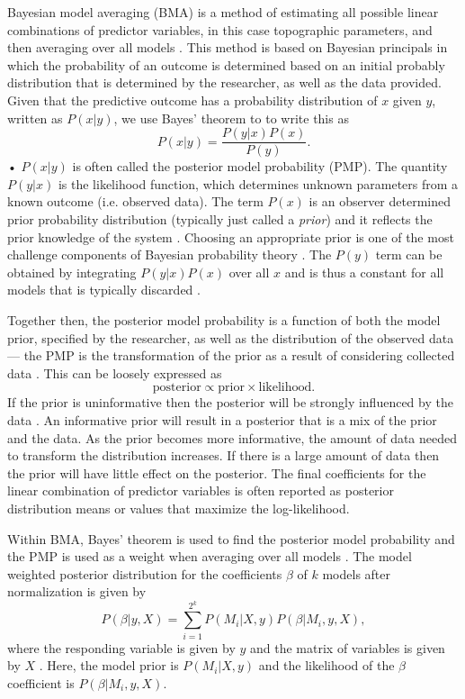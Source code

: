 \documentclass[12pt]{article}
\begin{document}
Bayesian model averaging (BMA) is a method of estimating all possible linear combinations of predictor variables, in this case topographic parameters, and then averaging over all models \citep{Raftery1997, Wasserman2000, Raftery2005}.  This method is based on Bayesian principals in which the probability of an outcome is determined based on an initial probably distribution that is determined by the researcher, as well as the data provided. Given that the predictive outcome has a probability distribution of $x$ given $y$, written as $P(x|y)$, we use Bayes' theorem to to write this as
\begin{equation}
P(x|y) = \frac{P(y|x)P(x)}{P(y)}.
\end{equation}•
$P(x|y)$ is often called the posterior model probability (PMP). The quantity $P(y|x)$ is the likelihood function, which determines unknown parameters from a known outcome (i.e. observed data). The term $P(x)$ is an observer determined prior probability distribution (typically just called a \textit{prior}) and it reflects the prior knowledge of the system \citep{Raftery1997}. Choosing an appropriate prior is one of the most challenge components of Bayesian probability theory \citep{Wasserman2000}. The $P(y)$ term can be obtained by integrating $P(y|x)P(x)$ over all $x$ and is thus a constant for all models that is typically discarded \citep{Wasserman2000}. 

Together then, the posterior model probability is a function of both the model prior, specified by the researcher, as well as the distribution of the observed data --- the PMP is the transformation of the prior as a result of considering collected data \citep{Wasserman2000}. This can be loosely expressed as
\begin{equation}
\textrm{posterior} \propto \textrm{prior} \times \textrm{likelihood}.
\end{equation}
If the prior is uninformative then the posterior will be strongly influenced by the data \citep{Wasserman2000}. An informative prior will result in a posterior that is a mix of the prior and the data. As the prior becomes more informative, the amount of data needed to transform the distribution increases. If there is a large amount of data then the prior will have little effect on the posterior. The final coefficients for the linear combination of predictor variables is often reported as posterior distribution means or values that maximize the log-likelihood. 

Within BMA, Bayes' theorem is used to find the posterior model probability and the PMP is used as a weight when averaging over all models \citep{Wasserman2000}. The model weighted posterior distribution for the coefficients $\beta$ of $k$ models after normalization is given by 
\begin{equation}
P(\beta| y,X) = \sum\limits_{i=1}^{2^k} P(M_i | X,y)P(\beta | M_i , y, X),
\end{equation}
where the responding variable is given by $y$ and the matrix of variables is given by $X$ \citep{Raftery1997}. Here, the model prior is $P(M_i | X,y)$ and the likelihood of the $\beta$ coefficient is $P(\beta | M_i , y, X)$.
\end{document}
